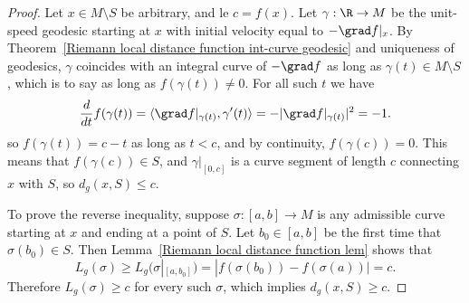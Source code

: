 \begin{proof}
Let $x\in M\setminus S$ be arbitrary, and le $c=f(x)$. Let $\gamma:\R\to M$ be the unit-speed geodesic starting at $x$ with initial velocity equal to $-\grad f|_x$. By 
Theorem~\ref{Riemann local distance function int-curve geodesic} and uniqueness of geodesics, $\gamma$ coincides with an integral curve of $-\grad f$ as long as 
$\gamma(t)\in M\setminus S$, which is to say as long as $f(\gamma(t))\neq 0$. For all such $t$ we have
\[\frac{d}{dt}f(\gamma(t))=\langle\grad f|_{\gamma(t)},\gamma'(t)\rangle=-|\grad f|_{\gamma(t)}|^2=-1.\]
so $f(\gamma(t))=c-t$ as long as $t<c$, and by continuity, $f(\gamma(c))=0$. This means that $f(\gamma(c))\in S$, and $\gamma|_{[0,c]}$ is a curve segment of length $c$ 
connecting $x$ with $S$, so $d_g(x,S)\leq c$.\par
To prove the reverse inequality, suppose $\sigma:[a,b]\to M$ is any admissible curve starting at $x$ and ending at a point of $S$. Let $b_0\in[a,b]$ be the first time 
that $\sigma(b_0)\in S$. Then Lemma~\ref{Riemann local distance function lem} shows that
\[L_g(\sigma)\geq L_g(\sigma|_{[a,b_0]})=|f(\sigma(b_0))-f(\sigma(a))|=c.\]
Therefore $L_g(\sigma)\geq c$ for every such $\sigma$, which implies $d_g(x,S)\geq c$.
\end{proof}
